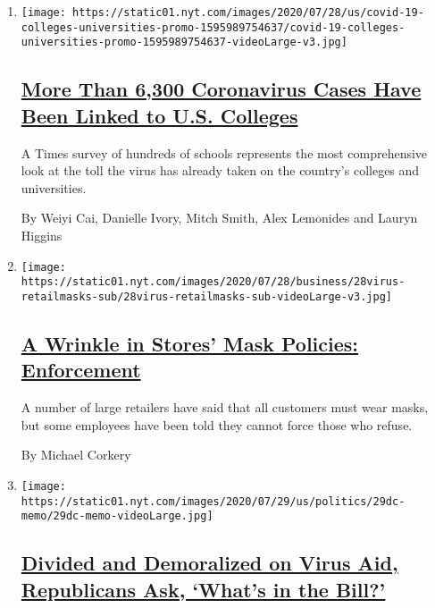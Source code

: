 \begin{enumerate}
\def\labelenumi{\arabic{enumi}.}
\item
  \texttt{[image: https://static01.nyt.com/images/2020/07/28/us/covid-19-colleges-universities-promo-1595989754637/covid-19-colleges-universities-promo-1595989754637-videoLarge-v3.jpg]}

  \hypertarget{more-than-6300-coronavirus-cases-have-been-linked-to-us-colleges}{%
  \subsection{\texorpdfstring{\href{/interactive/2020/07/28/us/covid-19-colleges-universities.html}{More
  Than 6,300 Coronavirus Cases Have Been Linked to U.S.
  Colleges}}{More Than 6,300 Coronavirus Cases Have Been Linked to U.S. Colleges}}\label{more-than-6300-coronavirus-cases-have-been-linked-to-us-colleges}}

  A Times survey of hundreds of schools represents the most
  comprehensive look at the toll the virus has already taken on the
  country's colleges and universities.

  By Weiyi Cai, Danielle Ivory, Mitch Smith, Alex Lemonides and Lauryn
  Higgins
\item
  \texttt{[image: https://static01.nyt.com/images/2020/07/28/business/28virus-retailmasks-sub/28virus-retailmasks-sub-videoLarge-v3.jpg]}

  \hypertarget{a-wrinkle-in-stores-mask-policies-enforcement}{%
  \subsection{\texorpdfstring{\href{/2020/07/29/business/coronavirus-masks-stores-walmart.html}{A
  Wrinkle in Stores' Mask Policies:
  Enforcement}}{A Wrinkle in Stores' Mask Policies: Enforcement}}\label{a-wrinkle-in-stores-mask-policies-enforcement}}

  A number of large retailers have said that all customers must wear
  masks, but some employees have been told they cannot force those who
  refuse.

  By Michael Corkery
\item
  \texttt{[image: https://static01.nyt.com/images/2020/07/29/us/politics/29dc-memo/29dc-memo-videoLarge.jpg]}

  \hypertarget{divided-and-demoralized-on-virus-aid-republicans-ask-whats-in-the-bill}{%
  \subsection{\texorpdfstring{\href{/2020/07/29/us/politics/republicans-congress-virus-aid.html}{Divided
  and Demoralized on Virus Aid, Republicans Ask, `What's in the
  Bill?'}}{Divided and Demoralized on Virus Aid, Republicans Ask, `What's in the Bill?'}}\label{divided-and-demoralized-on-virus-aid-republicans-ask-whats-in-the-bill}}


\end{enumerate}
